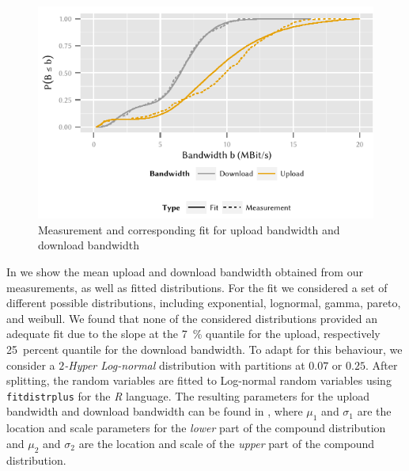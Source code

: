 \begin{figure}
  \includegraphics{application/cloud_file_synchronization/application_measurements/figures/bandwidths}
  \caption{Measurement and corresponding fit for upload bandwidth \uploadbandwidth and download bandwidth \downloadbandwidth}
  \label{fig:application:cloud_file_synchronisation:application_measurements:bandwidth_preparation_times:measurement_setup:bandwidths}
\end{figure}

In  we show the mean upload and download bandwidth obtained from our measurements, as well as fitted distributions.
For the fit we considered a set of different possible distributions, including exponential, lognormal, gamma, pareto, and weibull.
We found that none of the considered distributions provided an adequate fit due to the slope at the \SI{7}{\percent} quantile for the upload, respectively \SI{25}{percent} quantile for the download bandwidth.
To adapt for this behaviour, we consider a \emph{$2$-Hyper Log-normal} distribution \cite{Wang2006} with partitions at \(0.07\) or \({0.25}\).
After splitting, the random variables are fitted to Log-normal random variables using \texttt{fitdistrplus} for the \emph{R} language.
The resulting parameters for the upload bandwidth \uploadbandwidth and download bandwidth \downloadbandwidth can be found in , where \(\mu_1\) and \(\sigma_1\) are the location and scale parameters for the \emph{lower} part of the compound distribution and \(\mu_2\) and \(\sigma_2\) are the location and scale of the \emph{upper} part of the compound distribution.

